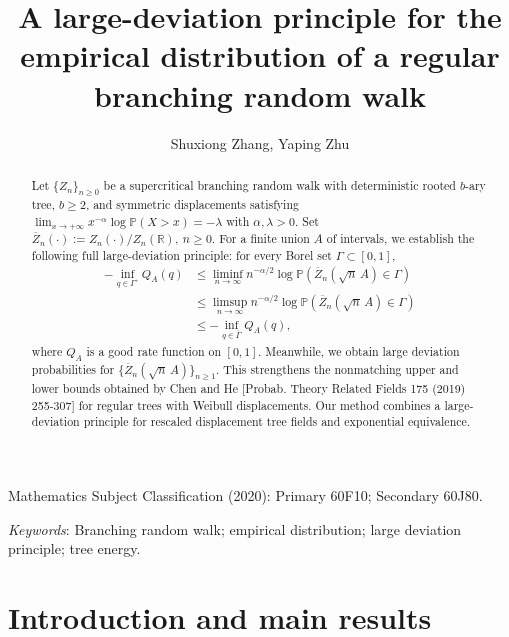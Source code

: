 \documentclass[a4paper, 11pt]{article}
\newcommand{\Pp}{\mathbb P}
\newcommand{\1}{\mathbf 1}
\theoremstyle{plain}
\begin{document}
	\title{A large-deviation principle for the empirical distribution of a regular branching random walk}
	\author{Shuxiong Zhang, Yaping Zhu}
	\maketitle
	\renewcommand{\thefootnote}{\fnsymbol{footnote}}


\begin{abstract}
Let \(\{Z_n\}_{n\geq0}\) be a supercritical branching
random walk with deterministic rooted
\(b\)-ary tree, \(b\geq2\), and symmetric displacements satisfying
\(\lim_{x\to+\infty}x^{-\alpha}\log\Pp(X>x)=-\lambda \) with \(\alpha,\lambda>0\). Set $\overline Z_n(\cdot):=Z_n(\cdot)/Z_n(\mathbb{R}),~n\geq0.$ For a
finite union \(A\) of intervals, we establish the following full large-deviation principle: for every Borel set
\(\Gamma\subset[0,1]\),
\begin{align*}
  -\inf_{q\in\Gamma^\circ}Q_A(q)
  &\leq
  \liminf_{n\to\infty}n^{-\alpha/2}
  \log\Pp\!\left(\overline Z_n(\sqrt n\,A)\in\Gamma\right)\\
  &\leq
  \limsup_{n\to\infty}n^{-\alpha/2}
  \log\Pp\!\left(\overline Z_n(\sqrt n\,A)\in\Gamma\right)\\
  &\leq
  -\inf_{q\in\overline\Gamma}Q_A(q),
\end{align*}
where $Q_A$ is a good rate function on $[0,1]$. Meanwhile, we obtain large deviation probabilities for $\{\overline Z_n(\sqrt n\,A)\}_{n\geq1}.$ This strengthens the nonmatching upper and lower
bounds obtained by Chen and He  [Probab. Theory
Related Fields 175 (2019) 255-307]  for regular trees with Weibull
displacements. Our method combines a large-deviation principle for rescaled
displacement tree fields and exponential equivalence.
\end{abstract}
\bigskip
	\noindent Mathematics Subject Classification (2020): Primary 60F10; Secondary 60J80.
	
	\bigskip
	\noindent\textit{Keywords}: Branching random walk; empirical distribution; large deviation principle; tree energy.
\maketitle

\section{Introduction and main results}
\label{sec:introduction}
\end{document}
